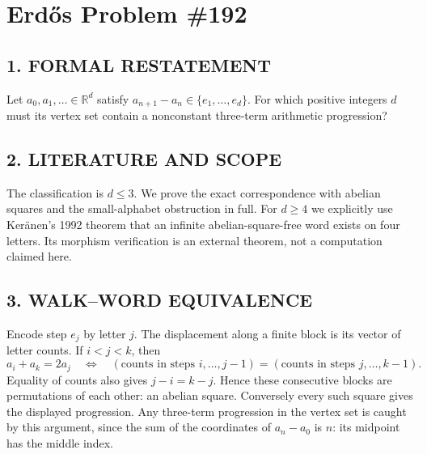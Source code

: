 \section{Erd\H{o}s Problem \#192}
\subsection*{1. FORMAL RESTATEMENT}
Let $a_0,a_1,\ldots\in\mathbb R^d$ satisfy $a_{n+1}-a_n\in\{e_1,\ldots,e_d\}$. For which positive integers $d$ must its vertex set contain a nonconstant three-term arithmetic progression?
\subsection*{2. LITERATURE AND SCOPE}
The classification is $d\le3$. We prove the exact correspondence with abelian squares and the small-alphabet obstruction in full. For $d\ge4$ we explicitly use Ker\"anen's 1992 theorem that an infinite abelian-square-free word exists on four letters. Its morphism verification is an external theorem, not a computation claimed here.
\subsection*{3. WALK--WORD EQUIVALENCE}
Encode step $e_j$ by letter $j$. The displacement along a finite block is its vector of letter counts. If $i<j<k$, then
\[
 a_i+a_k=2a_j
 \quad\Longleftrightarrow\quad
 (\text{counts in steps }i,\ldots,j-1)
 =(\text{counts in steps }j,\ldots,k-1).
\]
Equality of counts also gives $j-i=k-j$. Hence these consecutive blocks are permutations of each other: an abelian square. Conversely every such square gives the displayed progression. Any three-term progression in the vertex set is caught by this argument, since the sum of the coordinates of $a_n-a_0$ is $n$: its midpoint has the middle index.
